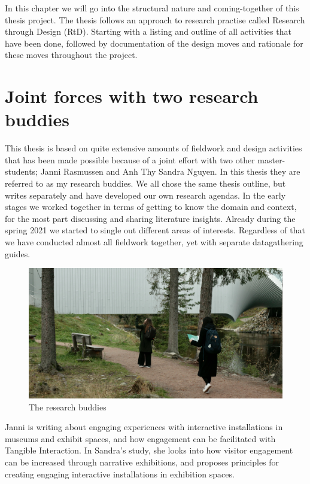 In this chapter we will go into the structural nature and coming-together of this thesis project. The thesis follows an approach to research practise called Research through Design (RtD). Starting with a listing and outline of all activities that have been done, followed by documentation of the design moves and rationale for these moves throughout the project.

\section{Joint forces with two research buddies}
This thesis is based on quite extensive amounts of fieldwork and design activities that has been made possible because of a joint effort with two other master-students; Janni Rasmussen and Anh Thy Sandra Nguyen. In this thesis they are referred to as my research buddies. We all chose the same thesis outline, but writes separately and have developed our own research agendas. In the early stages we worked together in terms of getting to know the domain and context, for the most part discussing and sharing literature insights. Already during the spring 2021 we started to single out different areas of interests. Regardless of that we have conducted almost all fieldwork together, yet with separate datagathering guides.

\begin{figure}[H]
\includegraphics[width=12.3cm]{pictures/methodology/buddies.JPG}
\caption{The research buddies}
\centering 
\end{figure}

Janni is writing about engaging experiences with interactive installations in museums and exhibit spaces, and how engagement can be facilitated with Tangible Interaction. In Sandra's study, she looks into how visitor engagement can be increased through narrative exhibitions, and proposes principles for creating engaging interactive installations in exhibition spaces.


